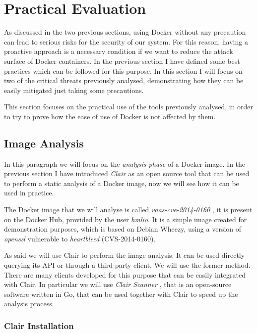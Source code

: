 \documentclass[a4paper,12pt]{article}
\begin{document}
\newpage

\section{Practical Evaluation}
\label{sec:practical_evaluation}

As discussed in the two previous sections, using Docker without any precaution
can lead to serious risks for the security of our system. For this reason,
having a proactive approach is a necessary condition if we want to reduce the
attack surface of Docker containers. In the previous section I have defined some
best practices which can be followed for this purpose. In this section I will
focus on two of the critical threats previously analysed, demonstrating how they
can be easily mitigated just taking some precautions. \par This section focuses
on the practical use of the tools previously analysed, in order to try to prove
how the ease of use of Docker is not affected by them. 

\subsection{Image Analysis}

In this paragraph we will focus on the \textit{analysis phase} of a Docker
image. In the previous section I have introduced \textit{Clair} as an open
source tool that can be used to perform a static analysis of a Docker image, now
we will see how it can be used in practice. \par The Docker image that we will
analyse is called \textit{vaas-cve-2014-0160} \cite{hmlio}, it is present on the
Docker Hub, provided by the user \textit{hmlio}. It is a simple image created
for demonstration purposes, which is based on Debian Wheezy, using a version of
\textit{openssl} vulnerable to \textit{heartbleed} (CVS-2014-0160). \par As said
we will use Clair to perform the image analysis. It can be used directly
querying its API or through a third-party client. We will use the former method.
There are many clients developed for this purpose that can be easily integrated
with Clair. In particular we will use \textit{Clair Scanner}
\cite{clair-scanner}, that is an open-source software written in Go, that can be
used together with Clair to speed up the analysis process.

\subsubsection{Clair Installation}
\end{document}
